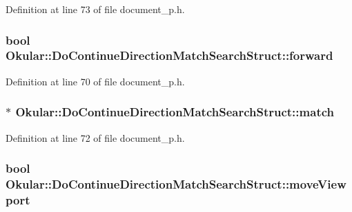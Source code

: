 Definition at line 73 of file document\+\_\+p.\+h.

\hypertarget{structOkular_1_1DoContinueDirectionMatchSearchStruct_ac33cf94809ed8498fc706efacd1cc79e}{
\subsubsection[{forward}]{\setlength{\rightskip}{0pt plus 5cm}bool Okular\+::\+Do\+Continue\+Direction\+Match\+Search\+Struct\+::forward}}\label{structOkular_1_1DoContinueDirectionMatchSearchStruct_ac33cf94809ed8498fc706efacd1cc79e}


Definition at line 70 of file document\+\_\+p.\+h.

\hypertarget{structOkular_1_1DoContinueDirectionMatchSearchStruct_a549890917311bf7520a62da5c6bf0861}{
\subsubsection[{match}]{$\ast$ Okular\+::\+Do\+Continue\+Direction\+Match\+Search\+Struct\+::match}}\label{structOkular_1_1DoContinueDirectionMatchSearchStruct_a549890917311bf7520a62da5c6bf0861}


Definition at line 72 of file document\+\_\+p.\+h.

\hypertarget{structOkular_1_1DoContinueDirectionMatchSearchStruct_a071c07e92481fedb9f382ae2e8935be9}{
\subsubsection[{move\+Viewport}]{\setlength{\rightskip}{0pt plus 5cm}bool Okular\+::\+Do\+Continue\+Direction\+Match\+Search\+Struct\+::move\+Viewport}}\label{structOkular_1_1DoContinueDirectionMatchSearchStruct_a071c07e92481fedb9f382ae2e8935be9}


